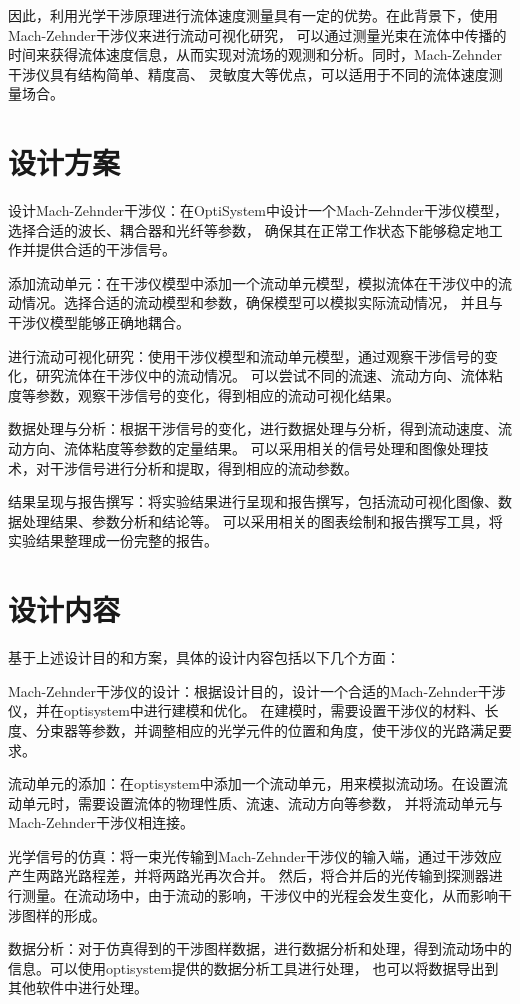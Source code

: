 \documentclass[12pt, a4paper, oneside]{article}
\begin{document}
\begin{spacing}{2.0}
因此，利用光学干涉原理进行流体速度测量具有一定的优势。在此背景下，使用Mach-Zehnder干涉仪来进行流动可视化研究，
可以通过测量光束在流体中传播的时间来获得流体速度信息，从而实现对流场的观测和分析。同时，Mach-Zehnder干涉仪具有结构简单、精度高、
灵敏度大等优点，可以适用于不同的流体速度测量场合。






\section{设计方案}
设计Mach-Zehnder干涉仪：在OptiSystem中设计一个Mach-Zehnder干涉仪模型，选择合适的波长、耦合器和光纤等参数，
确保其在正常工作状态下能够稳定地工作并提供合适的干涉信号。

添加流动单元：在干涉仪模型中添加一个流动单元模型，模拟流体在干涉仪中的流动情况。选择合适的流动模型和参数，确保模型可以模拟实际流动情况，
并且与干涉仪模型能够正确地耦合。

进行流动可视化研究：使用干涉仪模型和流动单元模型，通过观察干涉信号的变化，研究流体在干涉仪中的流动情况。
可以尝试不同的流速、流动方向、流体粘度等参数，观察干涉信号的变化，得到相应的流动可视化结果。

数据处理与分析：根据干涉信号的变化，进行数据处理与分析，得到流动速度、流动方向、流体粘度等参数的定量结果。
可以采用相关的信号处理和图像处理技术，对干涉信号进行分析和提取，得到相应的流动参数。

结果呈现与报告撰写：将实验结果进行呈现和报告撰写，包括流动可视化图像、数据处理结果、参数分析和结论等。
可以采用相关的图表绘制和报告撰写工具，将实验结果整理成一份完整的报告。



\section{设计内容}
基于上述设计目的和方案，具体的设计内容包括以下几个方面：

Mach-Zehnder干涉仪的设计：根据设计目的，设计一个合适的Mach-Zehnder干涉仪，并在optisystem中进行建模和优化。
在建模时，需要设置干涉仪的材料、长度、分束器等参数，并调整相应的光学元件的位置和角度，使干涉仪的光路满足要求。

流动单元的添加：在optisystem中添加一个流动单元，用来模拟流动场。在设置流动单元时，需要设置流体的物理性质、流速、流动方向等参数，
并将流动单元与Mach-Zehnder干涉仪相连接。

光学信号的仿真：将一束光传输到Mach-Zehnder干涉仪的输入端，通过干涉效应产生两路光路程差，并将两路光再次合并。
然后，将合并后的光传输到探测器进行测量。在流动场中，由于流动的影响，干涉仪中的光程会发生变化，从而影响干涉图样的形成。

数据分析：对于仿真得到的干涉图样数据，进行数据分析和处理，得到流动场中的信息。可以使用optisystem提供的数据分析工具进行处理，
也可以将数据导出到其他软件中进行处理。












\end{spacing}{}


\end{document}
